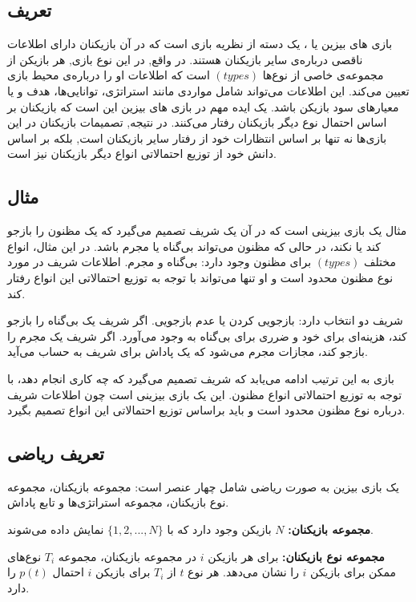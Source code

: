 \subsection*{تعریف}

بازی های بیزین یا
، یک دسته از نظریه بازی است که در آن بازیکنان دارای اطلاعات ناقصی درباره‌ی سایر بازیکنان هستند. در واقع, در این نوع بازی, هر بازیکن از مجموعه‌ی خاصی از نوع‌ها 
$(types)$ 
است که اطلاعات او را درباره‌ی محیط بازی تعیین می‌کند. این اطلاعات می‌تواند شامل مواردی مانند استراتژی، توانایی‌ها، هدف و یا معیارهای سود بازیکن باشد. یک ایده مهم در بازی های بیزین این است که بازیکنان بر اساس احتمال نوع دیگر بازیکنان رفتار می‌کنند. در نتیجه, تصمیمات بازیکنان در این بازی‌ها نه تنها بر اساس انتظارات خود از رفتار سایر بازیکنان است, بلکه بر اساس دانش خود از توزیع احتمالاتی انواع دیگر بازیکنان نیز است.

\subsection*{مثال}

مثال 
یک بازی بیزینی است که در آن یک شریف تصمیم می‌گیرد که یک مظنون را بازجو کند یا نکند، در حالی که مظنون می‌تواند بی‌گناه یا مجرم باشد. در این مثال، انواع مختلف
$(types)$ 
برای مظنون وجود دارد: بی‌گناه و مجرم. اطلاعات شریف در مورد نوع مظنون محدود است و او تنها می‌تواند با توجه به توزیع احتمالاتی این انواع رفتار کند.

شریف دو انتخاب دارد: بازجویی کردن یا عدم بازجویی. اگر شریف یک بی‌گناه را بازجو کند، هزینه‌ای برای خود و ضرری برای بی‌گناه به وجود می‌آورد. اگر شریف یک مجرم را بازجو کند، مجازات مجرم می‌شود که یک پاداش برای شریف به حساب می‌آید.


بازی به این ترتیب ادامه می‌یابد که شریف تصمیم می‌گیرد که چه کاری انجام دهد، با توجه به توزیع احتمالاتی انواع مظنون. این یک بازی بیزینی است چون اطلاعات شریف درباره نوع مظنون محدود است و باید براساس توزیع احتمالاتی این انواع تصمیم بگیرد.

\subsection*{تعریف ریاضی}

یک بازی بیزین به صورت ریاضی شامل چهار عنصر است: مجموعه بازیکنان، مجموعه نوع بازیکنان، مجموعه استراتژی‌ها و تابع پاداش.


\textbf{مجموعه بازیکنان:} $N$ بازیکن وجود دارد که با $\{1, 2, ..., N\}$ نمایش داده می‌شوند.

\textbf{مجموعه نوع بازیکنان:} برای هر بازیکن $i$ در مجموعه بازیکنان، مجموعه $T_i$ نوع‌های ممکن برای بازیکن $i$ را نشان می‌دهد. هر نوع $t$ از $T_i$ برای بازیکن $i$ احتمال $p(t)$ را دارد.

